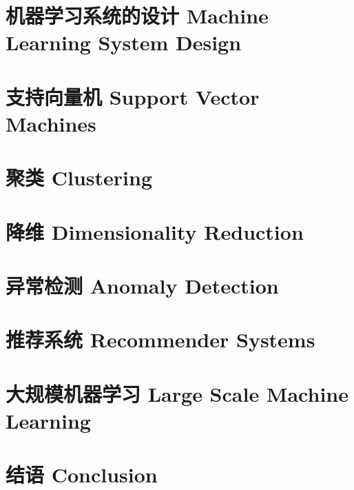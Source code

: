 \documentclass[12pt, a4paper]{article}
\begin{document}
\section{机器学习系统的设计 Machine Learning System Design}

\section{支持向量机 Support Vector Machines}

\section{聚类 Clustering}

\section{降维 Dimensionality Reduction}

\section{异常检测 Anomaly Detection}

\section{推荐系统 Recommender Systems}

\section{大规模机器学习 Large Scale Machine Learning}

\section{结语 Conclusion}
\end{document}
